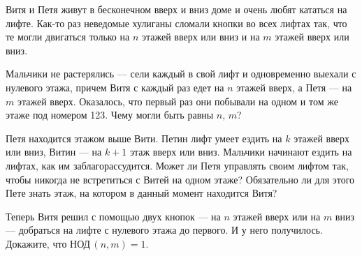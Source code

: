 ﻿

\noindent Витя и Петя живут в бесконечном вверх и вниз доме и очень любят кататься на лифте. Как-то раз неведомые хулиганы сломали кнопки во всех лифтах так, что те могли двигаться только на $n$ этажей вверх или вниз и на $m$ этажей вверх или вниз. 
\begin{itemize}

\itA Мальчики не растерялись — сели каждый в свой лифт и одновременно выехали с нулевого этажа, причем Витя с каждый раз едет на $n$ этажей вверх, а Петя — на $m$ этажей вверх. Оказалось, что первый раз они побывали на одном и том же этаже под номером 123. Чему могли быть равны $n$, $m$?

\itB Петя находится этажом выше Вити. Петин лифт умеет ездить на $k$ этажей вверх или вниз, Витин — на $k+1$ этаж вверх или вниз. Мальчики начинают ездить на лифтах, как им заблагорассудится. Может ли Петя управлять своим лифтом так, чтобы никогда не встретиться с Витей на одном этаже? Обязательно ли для этого Пете знать этаж, на котором в данный момент находится Витя?

\itC Теперь Витя решил с помощью двух кнопок — на $n$ этажей вверх или на $m$ вниз — добраться на лифте с нулевого этажа до первого. И у него получилось. Докажите, что НОД\,$(n,m)=1$.
\end{itemize}
